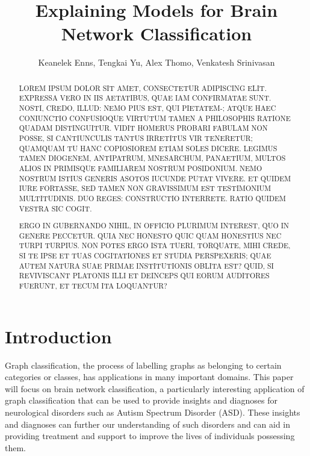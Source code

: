 \documentclass[letterpaper]{article}
\author{
Keanelek Enns, Tengkai Yu, Alex Thomo, Venkatesh Srinivasan\\
}
\title{Explaining Models for Brain Network Classification}
\begin{document}
\maketitle

\begin{abstract}
LOREM IPSUM DOLOR SIT AMET, CONSECTETUR ADIPISCING ELIT. EXPRESSA VERO IN IIS AETATIBUS, QUAE IAM CONFIRMATAE SUNT. NOSTI, CREDO, ILLUD: NEMO PIUS EST, QUI PIETATEM-; ATQUE HAEC CONIUNCTIO CONFUSIOQUE VIRTUTUM TAMEN A PHILOSOPHIS RATIONE QUADAM DISTINGUITUR. VIDIT HOMERUS PROBARI FABULAM NON POSSE, SI CANTIUNCULIS TANTUS IRRETITUS VIR TENERETUR; QUAMQUAM TU HANC COPIOSIOREM ETIAM SOLES DICERE. LEGIMUS TAMEN DIOGENEM, ANTIPATRUM, MNESARCHUM, PANAETIUM, MULTOS ALIOS IN PRIMISQUE FAMILIAREM NOSTRUM POSIDONIUM. NEMO NOSTRUM ISTIUS GENERIS ASOTOS IUCUNDE PUTAT VIVERE. ET QUIDEM IURE FORTASSE, SED TAMEN NON GRAVISSIMUM EST TESTIMONIUM MULTITUDINIS. DUO REGES: CONSTRUCTIO INTERRETE. RATIO QUIDEM VESTRA SIC COGIT.

ERGO IN GUBERNANDO NIHIL, IN OFFICIO PLURIMUM INTEREST, QUO IN GENERE PECCETUR. QUIA NEC HONESTO QUIC QUAM HONESTIUS NEC TURPI TURPIUS. NON POTES ERGO ISTA TUERI, TORQUATE, MIHI CREDE, SI TE IPSE ET TUAS COGITATIONES ET STUDIA PERSPEXERIS; QUAE AUTEM NATURA SUAE PRIMAE INSTITUTIONIS OBLITA EST? QUID, SI REVIVISCANT PLATONIS ILLI ET DEINCEPS QUI EORUM AUDITORES FUERUNT, ET TECUM ITA LOQUANTUR?
\end{abstract}

\section{Introduction}

Graph classification, the process of labelling graphs as belonging to certain categories or classes, has applications in many important domains.
This paper will focus on brain network classification, a particularly interesting application of graph classification that can be used to provide insights and diagnoses for neurological disorders such as Autism Spectrum Disorder (ASD).
These insights and diagnoses can further our understanding of such disorders and can aid in providing treatment and support to improve the lives of individuals possessing them.
\end{document}
